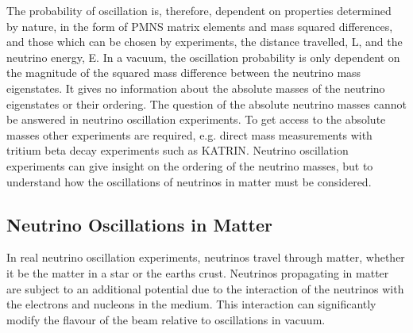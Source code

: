 The probability of oscillation is, therefore, dependent on properties determined
by nature, in the form of PMNS matrix elements and mass squared differences, and
those which can be chosen by experiments, the distance travelled, L, and the
neutrino energy, E. In a vacuum, the oscillation probability is only dependent 
on the magnitude of the squared mass difference between the neutrino mass
eigenstates. It gives no information about the absolute masses of the 
neutrino eigenstates or their ordering. The question of the absolute
neutrino masses cannot be answered in neutrino oscillation experiments. To get
access to the absolute masses other experiments are required, e.g. direct mass
measurements with tritium beta decay experiments such as 
KATRIN\cite{Aker:2019qfn}.  Neutrino oscillation experiments can give insight 
on the ordering of the neutrino masses, but to understand how the oscillations 
of neutrinos in matter must be considered.

\subsection{Neutrino Oscillations in Matter}
In real neutrino oscillation experiments, neutrinos travel through matter,
whether it be the matter in a star or the earths crust. Neutrinos propagating in
matter are subject to an additional potential due to the interaction of the 
neutrinos with the electrons and nucleons in the medium.  This interaction can 
significantly modify the flavour of the beam relative to oscillations in 
vacuum.

